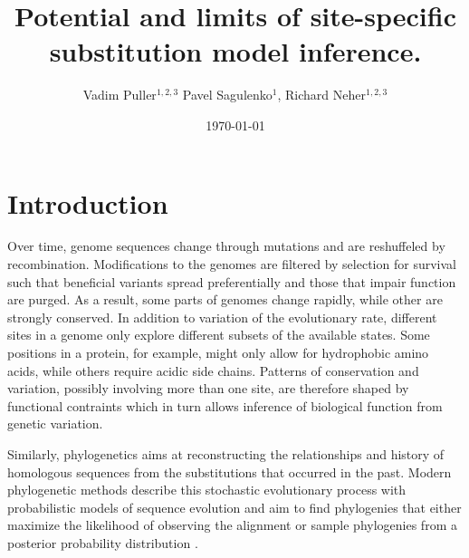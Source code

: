 \documentclass[aps,rmp,twocolumn]{revtex4}
\begin{document}
\title{Potential and limits of site-specific substitution model inference.}
\author{Vadim Puller$^{1,2,3}$ Pavel Sagulenko$^{1}$, Richard Neher$^{1,2,3}$}

\date{\today}

\maketitle

\section*{Introduction}
Over time, genome sequences change through mutations and are reshuffeled by recombination.
Modifications to the genomes are filtered by selection for survival such that beneficial variants spread preferentially and those that impair function are purged.
As a result, some parts of genomes change rapidly, while other are strongly conserved.
In addition to variation of the evolutionary rate, different sites in a genome only explore different subsets of the available states.
Some positions in a protein, for example, might only allow for hydrophobic amino acids, while others require acidic side chains.
Patterns of conservation and variation, possibly involving more than one site, are therefore shaped by functional contraints which in turn allows inference of biological function from genetic variation.

Similarly, phylogenetics aims at reconstructing the relationships and history of homologous sequences from the substitutions that occurred in the past.
Modern phylogenetic methods describe this stochastic evolutionary process with probabilistic models of sequence evolution and aim to find phylogenies that either maximize the likelihood of observing the alignment or sample phylogenies from a posterior probability distribution \citep{felsenstein2004inferring}.
\end{document}
